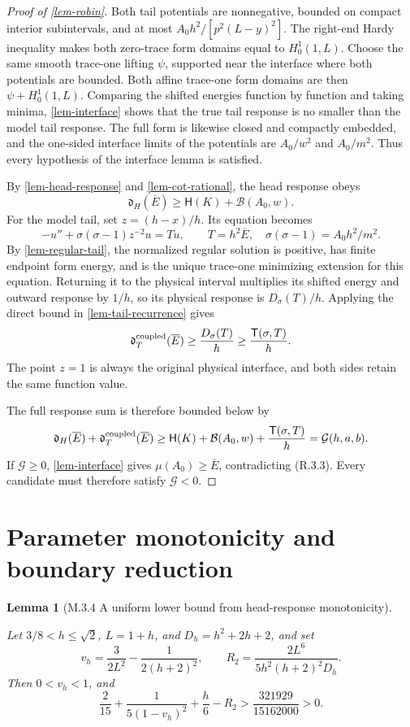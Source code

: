 \documentclass[11pt,a4paper]{article}
\theoremstyle{proofmanuscript}
\newtheorem{lemma}[theorem]{Lemma}
\begin{document}
\begin{proof}[Proof of \ref{lem-robin}]
Both tail potentials are nonnegative, bounded on compact interior subintervals, and at most \(A_0h^2/[p^2(L-y)^2]\). The right-end Hardy inequality makes both zero-trace form domains equal to \(H_0^1(1,L)\). Choose the same smooth trace-one lifting \(\psi\), supported near the interface where both potentials are bounded. Both affine trace-one form domains are then \(\psi+H_0^1(1,L)\). Comparing the shifted energies function by function and taking minima, \ref{lem-interface} shows that the true tail response is no smaller than the model tail response. The full form is likewise closed and compactly embedded, and the one-sided interface limits of the potentials are \(A_0/w^2\) and \(A_0/m^2\). Thus every hypothesis of the interface lemma is satisfied.

By \ref{lem-head-response} and \ref{lem-cot-rational}, the head response obeys \[
\mathfrak d_H(\overline E)\ge\mathsf H(K)+\mathcal B(A_0,w).
\] For the model tail, set \(z=(h-x)/h\). Its equation becomes \[
-u''+\sigma(\sigma-1)z^{-2}u=T u,
\qquad T=h^2\overline E,\quad\sigma(\sigma-1)=A_0h^2/m^2.
\] By \ref{lem-regular-tail}, the normalized regular solution is positive, has finite endpoint form energy, and is the unique trace-one minimizing extension for this equation. Returning it to the physical interval multiplies its shifted energy and outward response by \(1/h\), so its physical response is \(D_\sigma(T)/h\). Applying the direct bound in \ref{lem-tail-recurrence} gives \[
\mathfrak d_T^{\rm coupled}(\overline E)
\ge\frac{D_\sigma(T)}h\ge\frac{\mathsf T(\sigma,T)}h.
\] The point \(z=1\) is always the original physical interface, and both sides retain the same function value.

The full response sum is therefore bounded below by \[
\mathfrak d_H(\overline E)+\mathfrak d_T^{\rm coupled}(\overline E)
\ge\mathsf H(K)+\mathcal B(A_0,w)+\frac{\mathsf T(\sigma,T)}h
=\mathcal G(h,a,b).
\] If \(\mathcal G\ge0\), \ref{lem-interface} gives \(\mu(A_0)\ge\overline E\), contradicting (R.3.3). Every candidate must therefore satisfy \(\mathcal G<0\).

\end{proof}


\section{Parameter monotonicity and boundary reduction}

\begin{lemma}[M.3.4 A uniform lower bound from head-response monotonicity]\label{lem-m34-identity}

Let \(3/8<h\le\sqrt2\), \(L=1+h\), and \(D_h=h^2+2h+2\), and set \[
v_h=\frac3{2L^2}-\frac1{2(h+2)^2},\qquad
R_2=\frac{2L^6}{5h^2(h+2)^2D_h}.
\] Then \(0<v_h<1\), and \[
\frac2{15}+\frac1{5(1-v_h)^2}+\frac h6-R_2
>\frac{321929}{15162000}>0.                    \tag{M.3.4}
\]

\end{lemma}
\end{document}
